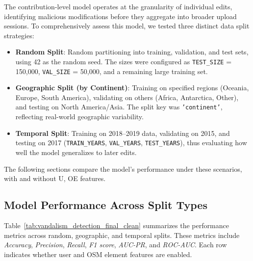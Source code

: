 \documentclass[
    13pt, %
    a4paper, %
    listof=totoc, %
    bibliography=totoc, %
    index=totoc, %
    headsepline
]{scrreprt}
\begin{document}
The contribution-level model operates at the granularity of individual edits, identifying malicious modifications before they aggregate into broader upload sessions. To comprehensively assess this model, we tested three distinct data split strategies:
\begin{itemize}
    \item \textbf{Random Split}: Random partitioning into training, validation, and test sets, using 42 as the random seed. The sizes were configured as \texttt{TEST\_SIZE} = 150,000, \texttt{VAL\_SIZE} = 50,000, and a remaining large training set.
    \item \textbf{Geographic Split (by Continent)}: Training on specified regions (Oceania, Europe, South America), validating on others (Africa, Antarctica, Other), and testing on North America/Asia. The split key was \texttt{'continent'}, reflecting real-world geographic variability.
    \item \textbf{Temporal Split}: Training on 2018--2019 data, validating on 2015, and testing on 2017 (\texttt{TRAIN\_YEARS}, \texttt{VAL\_YEARS}, \texttt{TEST\_YEARS}), thus evaluating how well the model generalizes to later edits.
\end{itemize}

The following sections compare the model’s performance under these scenarios, with and without U, OE features.

\subsection{Model Performance Across Split Types}
\label{sec:split_performance}

Table~\ref{tab:vandalism_detection_final_clean} summarizes the performance metrics across random, geographic, and temporal splits. These metrics include \emph{Accuracy}, \emph{Precision}, \emph{Recall}, \emph{F1 score}, \emph{AUC-PR}, and \emph{ROC-AUC}. Each row indicates whether user and OSM element features are enabled. 
\end{document}
